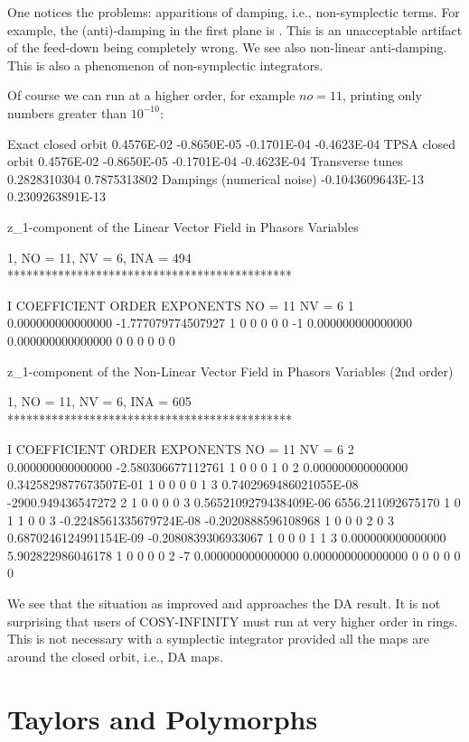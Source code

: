 \documentclass{hitec}     %
\newcommand{\Section}[1]{\section{#1}\vspace*{-1ex}}
\begin{document}
{{ 
 One notices the problems: apparitions of damping, i.e., non-symplectic terms. For example, the (anti)-damping in the first plane is . This is an unacceptable artifact of the feed-down being completely wrong. We see also non-linear anti-damping. This is also a phenomenon of non-symplectic integrators.
 
 
 Of course we can run at a higher order, for example $no=11$, printing only numbers greater than $10^{-10}$:
 
 \begin{code}
Exact closed orbit  0.4576E-02 -0.8650E-05 -0.1701E-04 -0.4623E-04
TPSA  closed orbit  0.4576E-02 -0.8650E-05 -0.1701E-04 -0.4623E-04
 Transverse tunes
  0.2828310304       0.7875313802
 Dampings (numerical noise)
 -0.1043609643E-13   0.2309263891E-13

 z_1-component of the Linear Vector Field in Phasors Variables

          1, NO =   11, NV =    6, INA =  494
 *********************************************

    I  COEFFICIENT          ORDER   EXPONENTS
      NO =    11      NV =     6
   1   0.000000000000000      -1.777079774507927       1  0  0  0  0  0
    -1   0.000000000000000       0.000000000000000       0  0  0  0  0  0

 z_1-component of the Non-Linear Vector Field in Phasors Variables (2nd order)

          1, NO =   11, NV =    6, INA =  605
 *********************************************

    I  COEFFICIENT          ORDER   EXPONENTS
      NO =    11      NV =     6
   2   0.000000000000000      -2.580306677112761       1  0  0  0  1  0
   2   0.000000000000000      0.3425829877673507E-01   1  0  0  0  0  1
   3  0.7402969486021055E-08  -2900.949436547272       2  1  0  0  0  0
   3  0.5652109279438409E-06   6556.211092675170       1  0  1  1  0  0
   3 -0.2248561335679724E-08 -0.2020888596108968       1  0  0  0  2  0
   3  0.6870246124991154E-09 -0.2080839306933067       1  0  0  0  1  1
   3   0.000000000000000       5.902822986046178       1  0  0  0  0  2
    -7   0.000000000000000       0.000000000000000       0  0  0  0  0  0
 \end{code}
  \renewcommand{\codefont}{\small}
  
 We see that the situation as improved and approaches the DA result.     It is not surprising that users of COSY-INFINITY must run at very higher order in rings. This is not necessary with a symplectic integrator provided all the maps are around the closed orbit, i.e., DA maps.
\Section{Taylors and Polymorphs}
\label{s:fundamental}
 
}}
\end{document}
